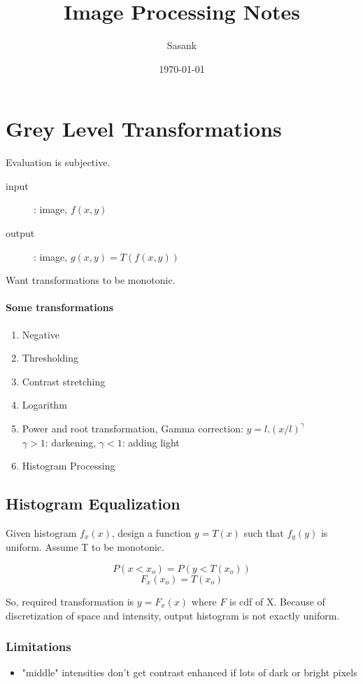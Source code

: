\documentclass[a4paper]{article}
\begin{document}
\title{Image Processing Notes}
\author{Sasank}
\date{\today}
\maketitle

\section{Grey Level Transformations}
Evaluation is subjective.
\begin{description}
\item[input]: image, $f(x,y)$
\item[output]: image, $g(x,y) = T(f(x,y))$
\end{description}
Want transformations to be monotonic.

\paragraph{Some transformations}
\begin{enumerate}
\item Negative
\item Thresholding
\item Contrast stretching
\item Logarithm
\item Power and root transformation, Gamma correction:  $y = l.(x/l)^\gamma$
\\ $\gamma >1$: darkening,  $\gamma < 1$: adding light
\item Histogram Processing
\end{enumerate}

\subsection{Histogram Equalization}
Given histogram $f_x(x)$, design a function $y = T(x)$ such that $f_y(y)$ is uniform. Assume T to be monotonic.

$$P(x<x_o) = P(y<T(x_o))$$
$$F_x(x_o) = T(x_o)$$

So, required transformation is $y = F_x(x)$ where $F$ is cdf of X.
Because of discretization of space and intensity, output histogram is not exactly uniform.

\subsubsection{Limitations}
\begin{itemize}
\item "middle" intensities don't get contrast enhanced if lots of dark or bright pixels
\end{itemize}
\end{document}
